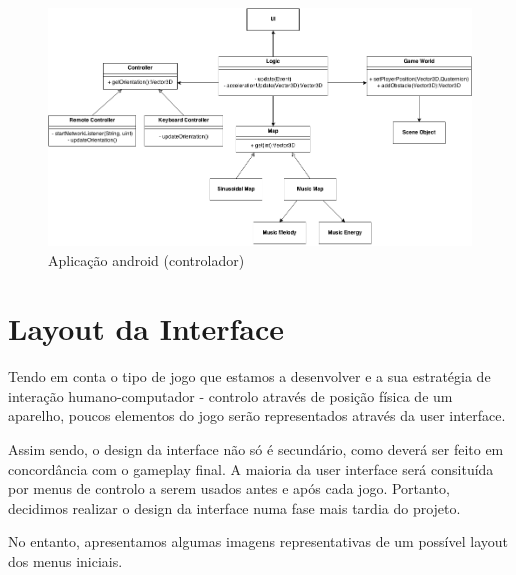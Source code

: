 \documentclass{article}
\begin{document}
\begin{figure}[H]
\begin{center}
\includegraphics[scale=0.4]{Classes.png}
\end{center}
\caption{Aplicação android (controlador)}
\end{figure}

\section{Layout da Interface}
Tendo em conta o tipo de jogo que estamos a desenvolver e a sua estratégia de interação humano-computador - controlo através de posição física de um aparelho, poucos elementos do jogo serão representados através da user interface.

Assim sendo, o design da interface não só é secundário, como deverá ser feito em concordância com o gameplay final. A maioria da user interface será consituída por menus de controlo a serem usados antes e após cada jogo. Portanto, decidimos realizar o design da interface numa fase mais tardia do projeto.

No entanto, apresentamos algumas imagens representativas de um possível layout dos menus iniciais.
\end{document}
